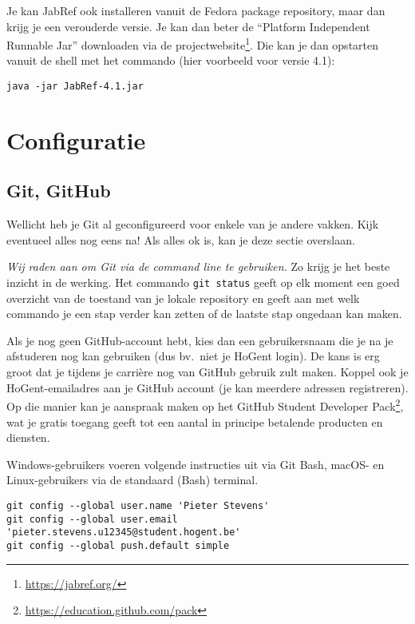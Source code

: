 Je kan JabRef ook installeren vanuit de Fedora package repository, maar dan krijg je een verouderde versie. Je kan dan beter de ``Platform Independent Runnable Jar'' downloaden via de projectwebsite\footnote{\url{https://jabref.org/}}. Die kan je dan opstarten vanuit de shell met het commando (hier voorbeeld voor versie 4.1):

\begin{verbatim}
java -jar JabRef-4.1.jar
\end{verbatim}

\section{Configuratie}

\subsection{Git, GitHub}

Wellicht heb je Git al geconfigureerd voor enkele van je andere vakken. Kijk eventueel alles nog eens na! Als alles ok is, kan je deze sectie overslaan.

\emph{Wij raden aan om Git via de command line te gebruiken.} Zo krijg je het beste inzicht in de werking. Het commando \texttt{git status} geeft op elk moment een goed overzicht van de toestand van je lokale repository en geeft aan met welk commando je een stap verder kan zetten of de laatste stap ongedaan kan maken.

Als je nog geen GitHub-account hebt, kies dan een gebruikersnaam die je na je afstuderen nog kan gebruiken (dus bv.~niet je HoGent login). De kans is erg groot dat je tijdens je carrière nog van GitHub gebruik zult maken. Koppel ook je HoGent-emailadres aan je GitHub account (je kan meerdere adressen registreren). Op die manier kan je aanspraak maken op het GitHub Student Developer Pack\footnote{\url{https://education.github.com/pack}}, wat je gratis toegang geeft tot een aantal in principe betalende producten en diensten.

Windows-gebruikers voeren volgende instructies uit via Git Bash, macOS- en Linux-gebruikers via de standaard (Bash) terminal.

\begin{verbatim}
git config --global user.name 'Pieter Stevens'
git config --global user.email 'pieter.stevens.u12345@student.hogent.be'
git config --global push.default simple
\end{verbatim}

